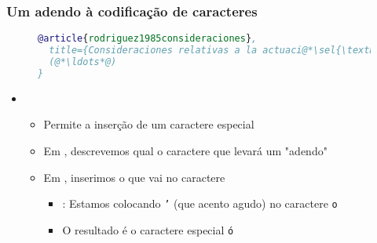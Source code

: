 \begin{frame}[fragile] \frametitle{Um adendo à codificação de caracteres}
\begin{figure}[!t]
\begin{lstlisting}[language=BibTeX]
@article{rodriguez1985consideraciones},
  title={Consideraciones relativas a la actuaci@*\sel{\textbackslash{}'\{o\}}*@n y l@*\sel{\textbackslash{}'\{i\}}*@mites de las oposiciones fonol@*\sel{\textbackslash{}'\{o\}}*@gicas interrupto/continuo y tenso/flojo en espa@*\sel{\textbackslash{}\textasciitilde{}\{n\}}*@ol},
  (@*\ldots*@)
}
\end{lstlisting}
\end{figure}

\begin{itemize}
	\item {}
	\begin{itemize}
		\item Permite a inserção de um caractere especial
		\item Em , descrevemos qual o caractere que levará um "adendo"
		\item Em , inserimos o que vai no caractere
		\begin{itemize}
			\item {}: Estamos colocando \texttt{'} (que acento agudo) no caractere \texttt{o}
			\item O resultado é o caractere especial \texttt{ó}
		\end{itemize}
	\end{itemize}
\end{itemize}
\end{frame}

